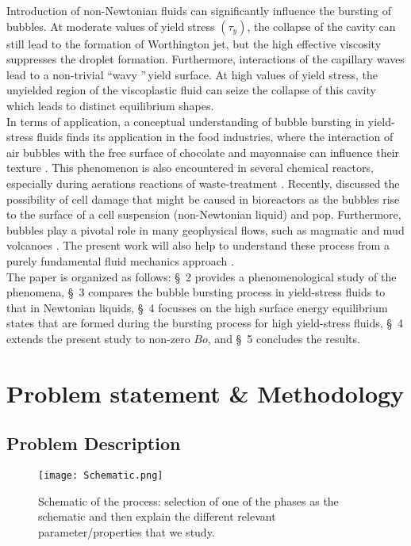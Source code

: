 \documentclass{jfm}
\begin{document}
Introduction of non-Newtonian fluids can significantly influence the bursting of bubbles. At moderate values of yield stress $\left(\tau_y\right)$, the collapse of the cavity can still lead to the formation of Worthington jet, but the high effective viscosity suppresses the droplet formation. Furthermore, interactions of the capillary waves lead to a non-trivial \textquotedblleft wavy \textquotedblright$\,$yield surface. At high values of yield stress, the unyielded region of the viscoplastic fluid can seize the collapse of this cavity which leads to distinct equilibrium shapes.\\
In terms of application, a conceptual understanding of bubble bursting in yield-stress fluids finds its application in the food industries, where the interaction of air bubbles with the free surface of chocolate and mayonnaise can influence their texture \citep{campbell2016bubbles}. This phenomenon is also encountered in several chemical reactors, especially during aerations reactions of waste-treatment \citep{blanch1976non}. Recently, \cite{walls2017quantifying} discussed the possibility of cell damage that might be caused in bioreactors as the bubbles rise to the surface of a cell suspension (non-Newtonian liquid) and pop. Furthermore, bubbles play a pivotal role in many geophysical flows, such as magmatic and mud volcanoes \citep{tran2015bubble}. The present work will also help to understand these process from a purely fundamental fluid mechanics approach \citep{gonnermann2007fluid}.\\
The paper is organized as follows: \S~2 provides a phenomenological study of the phenomena, \S~3 compares the bubble bursting process in yield-stress fluids to that in Newtonian liquids, \S~4 focusses on the high surface energy equilibrium states that are formed during the bursting process for high yield-stress fluids, \S~4 extends the present study to non-zero $Bo$, and \S~5 concludes the results.
 
\section{Problem statement  \& Methodology}\label{sec:problemDescriptionNmethodology}
\subsection{Problem Description}\label{sec:PD}
\begin{figure}
	\centerline{\texttt{[image: Schematic.png]}}%
	\caption{Schematic of the process: selection of one of the phases as the schematic and then explain the different relevant parameter/properties that we study.}
	\label{fig:Schematic}
\end{figure}
\end{document}

